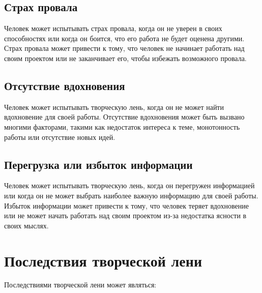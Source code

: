 \documentclass[a4paper, 14pt]{article}
\begin{document}
\subsection{Страх провала}
Человек может испытывать страх провала, когда он не уверен в своих способностях или когда он боится, что его работа не будет оценена другими.
Страх провала может привести к тому, что человек не начинает работать над своим проектом или не заканчивает его, чтобы избежать возможного провала.

\subsection{Отсутствие вдохновения}
Человек может испытывать творческую лень, когда он не может найти вдохновение для своей работы.
Отсутствие вдохновения может быть вызвано многими факторами, такими как недостаток интереса к теме, монотонность работы или отсутствие новых идей.

\subsection{Перегрузка или избыток информации}
Человек может испытывать творческую лень, когда он перегружен информацией или когда он не может выбрать наиболее важную информацию для своей работы.
Избыток информации может привести к тому, что человек теряет вдохновение или не может начать работать над своим проектом из-за недостатка ясности в своих мыслях.



\section{Последствия творческой лени}

Последствиями творческой лени может являться: 
\end{document}
